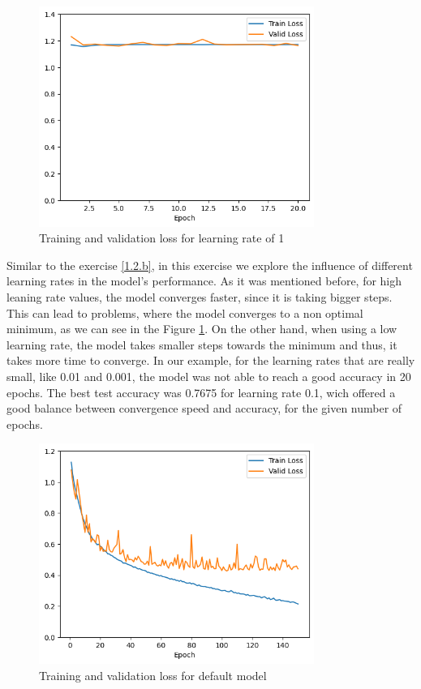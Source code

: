 \documentclass{article}
\begin{document}
\begin{figure}[H]
    \centering
    \includegraphics[width=0.8\textwidth]{"plots/mlp-training-loss-batch-16-lr-1.0-epochs-20-hidden-200-dropout-0.0-l2-0-layers-2-act-relu-opt-sgd.png"}
    \caption{Training and validation loss for learning rate of 1}
    \label{2.2b learning rate 1}
\end{figure}

Similar to the exercise \ref{1.2.b}, in this exercise we explore the influence of different learning rates in the model's performance.
As it was mentioned before, for high leaning rate values, the model converges faster, since it is taking bigger steps. This can lead to problems, 
where the model converges to a non optimal minimum, as we can see in the Figure \ref{2.2b learning rate 1}. On the other hand, when using a low learning rate,
the model takes smaller steps towards the minimum and thus, it takes more time to converge. In our example, for the learning rates that are really small, like 0.01 and 0.001,
the model was not able to reach a good accuracy in 20 epochs. The best test accuracy was 0.7675 for learning rate 0.1, wich offered a good balance between convergence speed and accuracy, for the given number of epochs.

\begin{figure}[H]
    \centering
    \includegraphics[width=0.8\textwidth]{"plots/mlp-training-loss-batch-256-lr-0.1-epochs-150-hidden-200-dropout-0.0-l2-0-layers-2-act-relu-opt-sgd.png"}
    \caption{Training and validation loss for default model}
    \label{2.2c default model}
\end{figure}
\end{document}
